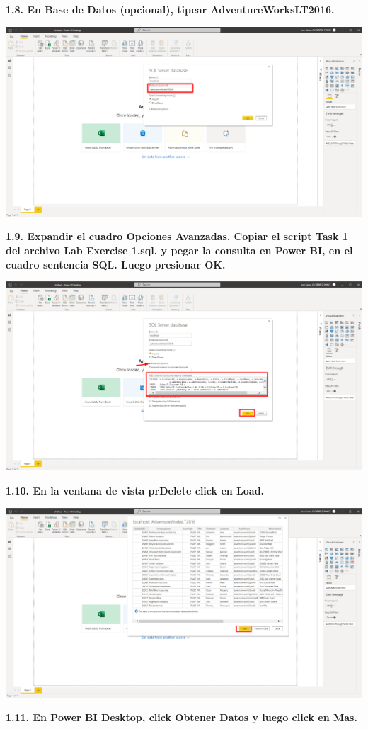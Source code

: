 \documentclass{article}
\begin{document}
\textbf{1.8. En \textbf{Base de Datos (opcional)}, tipear \textbf{AdventureWorksLT2016}.}

    \begin{center}
		\includegraphics[width=14cm]{./images/8} 
	\end{center}
\newpage
\textbf{1.9. Expandir el cuadro \textbf{Opciones Avanzadas}. Copiar el script \textbf{Task 1} del archivo \textbf{Lab Exercise 1.sql}. y pegar 
la consulta en Power BI, en el cuadro sentencia SQL. Luego presionar OK.}

    \begin{center}
		\includegraphics[width=14cm]{./images/9} 
	\end{center}

\textbf{1.10. En la ventana de vista prDelete click en \textbf{Load}.}

    \begin{center}
		\includegraphics[width=14cm]{./images/10} 
	\end{center}
\newpage
\textbf{1.11. En Power BI Desktop, click \textbf{Obtener Datos} y luego click en Mas.}
\end{document}
